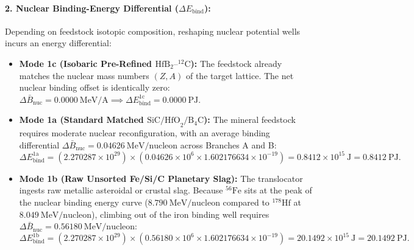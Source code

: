 \documentclass[11pt,onecolumn]{article}
\begin{document}
\paragraph{2. Nuclear Binding-Energy Differential ($\Delta E_{\text{bind}}$):}
Depending on feedstock isotopic composition, reshaping nuclear potential wells incurs an energy differential:
\begin{itemize}
    \item \textbf{Mode 1c (Isobaric Pre-Refined $\text{HfB}_2\text{--}^{12}\text{C}$):} The feedstock already matches the nuclear mass numbers $(Z, A)$ of the target lattice. The net nuclear binding offset is identically zero: $\Delta\bar{B}_{\text{nuc}} = 0.0000~\text{MeV/A} \implies \Delta E_{\text{bind}}^{\text{1c}} = 0.0000~\text{PJ}$.
    \item \textbf{Mode 1a (Standard Matched $\text{SiC/HfO}_2/\text{B}_4\text{C}$):} The mineral feedstock requires moderate nuclear reconfiguration, with an average binding differential $\Delta\bar{B}_{\text{nuc}} = 0.04626~\text{MeV/nucleon}$ across Branches A and B:
    \begin{equation}
    \Delta E_{\text{bind}}^{\text{1a}} = (2.270287\times 10^{29})\times (0.04626\times 10^6 \times 1.602176634\times 10^{-19}) = 0.8412\times 10^{15}~\text{J} = 0.8412~\text{PJ}.
    \end{equation}
    \item \textbf{Mode 1b (Raw Unsorted Fe/Si/C Planetary Slag):} The translocator ingests raw metallic asteroidal or crustal slag. Because $^{56}\text{Fe}$ sits at the peak of the nuclear binding energy curve ($8.790~\text{MeV/nucleon}$ compared to $^{178}\text{Hf}$ at $8.049~\text{MeV/nucleon}$), climbing out of the iron binding well requires $\Delta\bar{B}_{\text{nuc}} = 0.56180~\text{MeV/nucleon}$:
    \begin{equation}
    \Delta E_{\text{bind}}^{\text{1b}} = (2.270287\times 10^{29})\times (0.56180\times 10^6 \times 1.602176634\times 10^{-19}) = 20.1492\times 10^{15}~\text{J} = 20.1492~\text{PJ}.
    \end{equation}
\end{itemize}
\end{document}
